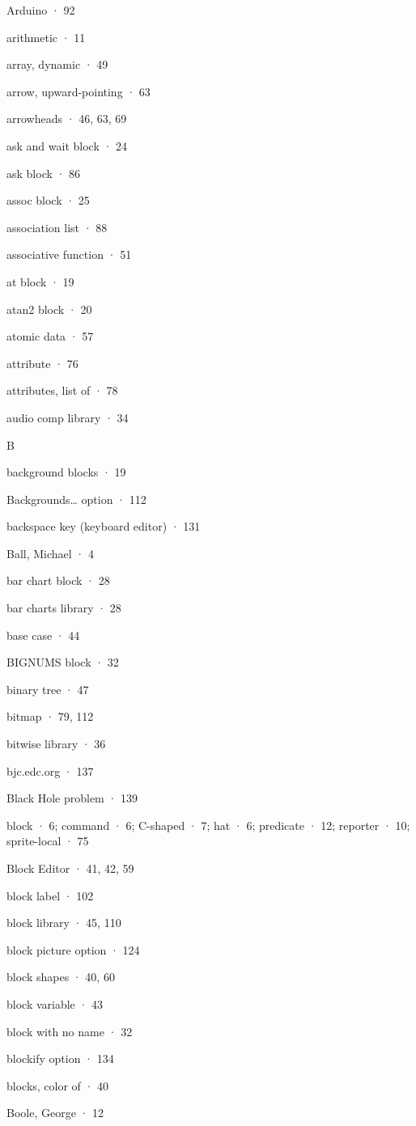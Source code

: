 Arduino · 92

arithmetic · 11

array, dynamic · 49

arrow, upward-pointing · 63

arrowheads · 46, 63, 69

ask and wait block · 24

ask block · 86

assoc block · 25

association list · 88

associative function · 51

at block · 19

atan2 block · 20

atomic data · 57

attribute · 76

attributes, list of · 78

audio comp library · 34

B

background blocks · 19

Backgrounds\ldots{} option · 112

backspace key (keyboard editor) · 131

Ball, Michael · 4

bar chart block · 28

bar charts library · 28

base case · 44

BIGNUMS block · 32

binary tree · 47

bitmap · 79, 112

bitwise library · 36

bjc.edc.org · 137

Black Hole problem · 139

block · 6; command · 6; C-shaped · 7; hat · 6; predicate · 12; reporter
· 10; sprite-local · 75

Block Editor · 41, 42, 59

block label · 102

block library · 45, 110

block picture option · 124

block shapes · 40, 60

block variable · 43

block with no name · 32

blockify option · 134

blocks, color of · 40

Boole, George · 12

